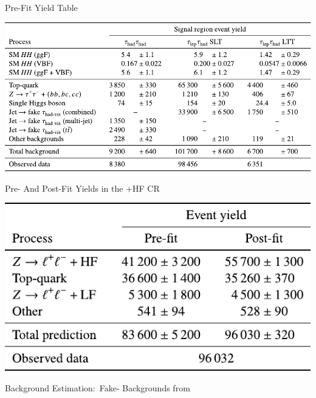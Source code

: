 \documentclass[11pt, xcolor={dvipsnames}, aspectratio=169]{beamer}
\begin{document}

\begin{frame}{Pre-Fit Yield Table}
  \centering

  \includegraphics[scale=0.9]{yieldtable_prefit}
\end{frame}


\begin{frame}{Pre- And Post-Fit Yields in the +HF CR}
  \centering

  \includegraphics[scale=0.9]{backup/zhf_yields}
\end{frame}


\begin{frame}[standout]
  Background Estimation:\ Fake-\allbold{\tauhadvis} Backgrounds from
  \allbold{\ttbar}
\end{frame}

\end{document}
